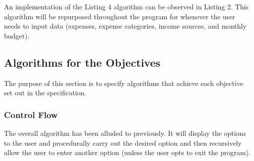 \documentclass[12pt]{article}
\begin{document}
  An implementation of the Listing 4 algorithm can be observed in Listing 2.
  This algorithm will be repurposed throughout the program for whenever the user needs to input data (expenses, expense categories, income sources, and monthly budget).

  \subsection{Algorithms for the Objectives}
  The purpose of this section is to specify algorithms that achieve each objective set out in the specification.
  \subsubsection{Control Flow}
  The overall algorithm has been alluded to previously. It will display the options to the user and procedurally carry out the desired option and then recursively allow the user to enter another option (unless the user opts to exit the program).
\end{document}
